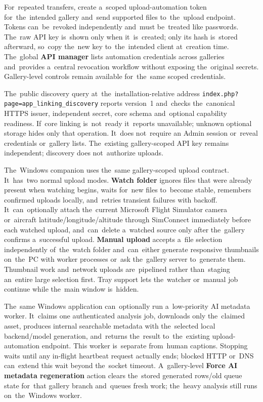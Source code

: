 \documentclass[11pt,a4paper]{article}
\newcommand{\ui}[1]{\textbf{#1}}
\begin{document}
For~repeated transfers, create a~scoped upload-automation token for~the~intended
gallery and~send supported files to~the~upload endpoint. Tokens can~be~revoked
independently and~must be~treated like passwords. The~raw API key is~shown only
when it~is~created; only its hash is~stored afterward, so~copy the~new key
to~the~intended client at~creation time. The~global \ui{API manager} lists
automation credentials across galleries and~provides a~central revocation
workflow without exposing the~original secrets. Gallery-level controls remain
available for~the~same scoped credentials.

The~public discovery query at~the~installation-relative address
\texttt{index.php?page=app\_linking\_discovery} reports version~1 and~checks
the~canonical HTTPS issuer, independent secret, core schema and~optional
capability readiness. If~core linking is~not~ready it~reports unavailable;
unknown optional storage hides only that operation. It~does not~require an
Admin session or~reveal credentials or~gallery lists. The~existing
gallery-scoped API key remains independent; discovery does not~authorize
uploads.

The~Windows companion uses the~same gallery-scoped upload contract. It~has~two
normal upload modes. \ui{Watch folder} ignores files that were already present
when watching begins, waits for~new files to~become stable, remembers confirmed
uploads locally, and~retries transient failures with backoff. It~can~optionally
attach the~current Microsoft Flight Simulator camera or~aircraft
latitude/longitude/altitude through SimConnect immediately before each watched
upload, and~can~delete a~watched source only after the~gallery confirms
a~successful upload. \ui{Manual upload} accepts a~file selection independently
of~the~watch folder and~can~either generate responsive thumbnails on~the~PC with
worker processes or~ask the~gallery server to~generate them. Thumbnail work
and~network uploads are~pipelined rather than~staging an~entire large selection
first. Tray support lets the~watcher or~manual job continue while the~main
window is~hidden.

The~same Windows application can~optionally run a~low-priority AI metadata
worker. It~claims one authenticated analysis job, downloads only the~claimed
asset, produces internal searchable metadata with the~selected local
backend/model generation, and~returns the~result to~the~existing
upload-automation endpoint. This worker is~separate from~human captions.
Stopping waits until any in-flight heartbeat request actually ends; blocked
HTTP or~DNS can~extend this wait beyond the~socket timeout.
A~gallery-level \ui{Force AI metadata regeneration} action clears the~stored
generated rows/old queue state for~that gallery branch and~queues fresh work;
the~heavy analysis still runs on~the~Windows worker.
\end{document}
